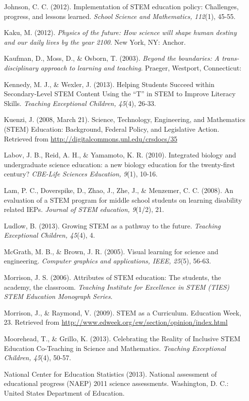 \documentclass[11.5pt]{sig-alternate} %
\begin{document}
Johnson, C. C. (2012). Implementation of STEM education policy: Challenges, progress, and lessons learned. \textit{School Science and Mathematics, 112}(1), 45-55.

Kaku, M. (2012). \textit{Physics of the future: How science will shape human destiny and our daily lives by the year 2100}. New York, NY: Anchor.

Kaufman, D., Moss, D., \& Osborn, T. (2003). \textit{Beyond the boundaries: A trans-disciplinary approach to learning and teaching}. Praeger, Westport, Connecticut:

Kennedy, M. J., \& Wexler, J. (2013). Helping Students Succeed within Secondary-Level STEM Content Using the “T” in STEM to Improve Literacy Skills. \textit{Teaching Exceptional Children, 45}(4), 26-33.

Kuenzi, J. (2008, March 21). Science, Technology, Engineering, and Mathematics (STEM) Education: Background, Federal Policy, and Legislative Action. Retrieved from \url{http://digitalcommons.unl.edu/crsdocs/35}

Labov, J. B., Reid, A. H., \& Yamamoto, K. R. (2010). Integrated biology and undergraduate science education: a new biology education for the twenty-first century? \textit{CBE-Life Sciences Education, 9}(1), 10-16.

Lam, P. C., Doverspike, D., Zhao, J., Zhe, J., \& Menzemer, C. C. (2008). An evaluation of a STEM program for middle school students on learning disability related IEPs.\textit{ Journal of STEM education, 9}(1/2), 21.

Ludlow, B. (2013). Growing STEM as a pathway to the future. \textit{Teaching Exceptional Children, 45}(4), 4.

McGrath, M. B., \& Brown, J. R. (2005). Visual learning for science and engineering. \textit{Computer graphics and applications, IEEE, 25}(5), 56-63.

Morrison, J. S. (2006). Attributes of STEM education: The students, the academy, the classroom. \textit{Teaching Institute for Excellence in STEM (TIES) STEM Education Monograph Series}.

Morrison, J., \& Raymond, V. (2009). STEM as a Curriculum. Education Week, 23. Retrieved from \url{http://www.edweek.org/ew/section/opinion/index.html}

Moorehead, T., \& Grillo, K. (2013). Celebrating the Reality of Inclusive STEM Education Co-Teaching in Science and Mathematics. \textit{Teaching Exceptional Children, 45}(4), 50-57.

National Center for Education Statistics (2013). National assessment of educational progress (NAEP) 2011 science assessments.  Washington, D. C.: United States Department of Education.
\end{document}
